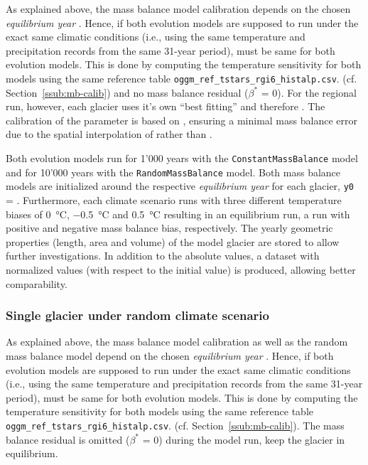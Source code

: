        As explained above, the mass balance model calibration depends on the chosen \textit{equilibrium year} \tstar{}. Hence, if both evolution models are supposed to run under the exact same climatic conditions (i.e., using the same temperature and precipitation records from the same 31-year period), \tstar{} must be same for both evolution models. This is done by computing the temperature sensitivity \mustar{} for both models using the same \tstar{} reference table \lstinline`oggm_ref_tstars_rgi6_histalp.csv`. (cf. Section~\ref{ssub:mb-calib}) and no mass balance residual ($\beta^*$ = 0). For the regional run, however, each glacier uses it's own ``best fitting'' \tstar{} and therefore \mustar. The calibration of the \mustar{} parameter is based on \citet{Marzeion2012b}, ensuring a minimal mass balance error due to the spatial interpolation of \tstar{} rather than \mustar{} \citep[for more details see][Sec. 3.3]{Maussion2019}.

        Both evolution models run for 1'000 years with the \lstinline`ConstantMassBalance` model and for 10'000 years with the \lstinline`RandomMassBalance` model. Both mass balance models are initialized around the respective \textit{equilibrium year} for each glacier, \lstinline`y0` = \tstar. Furthermore, each climate scenario runs with three different temperature biases of \SI{0}{\celsius}, \SI{-0.5}{\celsius} and \SI{+0.5}{\celsius} resulting in an equilibrium run, a run with positive and negative mass balance bias, respectively. The yearly geometric properties (length, area and volume) of the model glacier are stored to allow further investigations. In addition to the absolute values, a dataset with normalized values (with respect to the initial value) is produced, allowing better comparability.

        
        \subsubsection{Single glacier under random climate scenario} %
        \label{ssub:single_glacier_under_random_climate_scenario}
            

            As explained above, the mass balance model calibration as well as the random mass balance model depend on the chosen \textit{equilibrium year} \tstar{}. Hence, if both evolution models are supposed to run under the exact same climatic conditions (i.e., using the same temperature and precipitation records from the same 31-year period), \tstar{} must be same for both evolution models. This is done by computing the temperature sensitivity \mustar{} for both models using the same \tstar{} reference table \lstinline`oggm_ref_tstars_rgi6_histalp.csv`. (cf. Section~\ref{ssub:mb-calib}). The mass balance residual is omitted ($\beta^*$ = 0) during the model run, keep the glacier in equilibrium.

